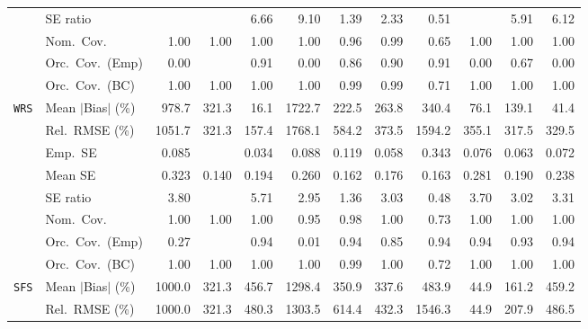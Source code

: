 \begin{landscape}
\begin{longtable}{llrrrrrrrrrr}
 & SE ratio &  &  & 6.66 & 9.10 & \cellcolor{rankone}1.39 & \cellcolor{rankthree}2.33 & \cellcolor{ranktwo}0.51 &  & 5.91 & 6.12 \\
 & Nom.\ Cov. & \cellcolor{rankthree}1.00 & 1.00 & 1.00 & 1.00 & \cellcolor{rankone}0.96 & \cellcolor{ranktwo}0.99 & 0.65 & 1.00 & 1.00 & 1.00 \\
 & Orc.\ Cov.\ (Emp) & 0.00 &  & \cellcolor{ranktwo}0.91 & 0.00 & 0.86 & \cellcolor{rankthree}0.90 & \cellcolor{rankone}0.91 & 0.00 & 0.67 & 0.00 \\
 & Orc.\ Cov.\ (BC) & \cellcolor{rankthree}1.00 & 1.00 & 1.00 & 1.00 & \cellcolor{rankone}0.99 & \cellcolor{ranktwo}0.99 & 0.71 & 1.00 & 1.00 & 1.00 \\
\addlinespace[2pt]
\quad \texttt{WRS} & Mean $|$Bias$|$ (\%) & 978.7 & 321.3 & \cellcolor{rankone}16.1 & 1722.7 & 222.5 & 263.8 & 340.4 & \cellcolor{rankthree}76.1 & 139.1 & \cellcolor{ranktwo}41.4 \\
 & Rel.\ RMSE (\%) & 1051.7 & \cellcolor{rankthree}321.3 & \cellcolor{rankone}157.4 & 1768.1 & 584.2 & 373.5 & 1594.2 & 355.1 & \cellcolor{ranktwo}317.5 & 329.5 \\
 & Emp.\ SE & 0.085 &  & 0.034 & 0.088 & 0.119 & 0.058 & 0.343 & 0.076 & 0.063 & 0.072 \\
 & Mean SE & 0.323 & 0.140 & 0.194 & 0.260 & 0.162 & 0.176 & 0.163 & 0.281 & 0.190 & 0.238 \\
 & SE ratio & 3.80 &  & 5.71 & \cellcolor{rankthree}2.95 & \cellcolor{rankone}1.36 & 3.03 & \cellcolor{ranktwo}0.48 & 3.70 & 3.02 & 3.31 \\
 & Nom.\ Cov. & \cellcolor{rankthree}1.00 & 1.00 & 1.00 & \cellcolor{rankone}0.95 & \cellcolor{ranktwo}0.98 & 1.00 & 0.73 & 1.00 & 1.00 & 1.00 \\
 & Orc.\ Cov.\ (Emp) & 0.27 &  & 0.94 & 0.01 & 0.94 & 0.85 & \cellcolor{rankone}0.94 & \cellcolor{ranktwo}0.94 & 0.93 & \cellcolor{rankthree}0.94 \\
 & Orc.\ Cov.\ (BC) & \cellcolor{ranktwo}1.00 & \cellcolor{rankthree}1.00 & 1.00 & 1.00 & \cellcolor{rankone}0.99 & 1.00 & 0.72 & 1.00 & 1.00 & 1.00 \\
\addlinespace[2pt]
\quad \texttt{SFS} & Mean $|$Bias$|$ (\%) & 1000.0 & \cellcolor{rankthree}321.3 & 456.7 & 1298.4 & 350.9 & 337.6 & 483.9 & \cellcolor{rankone}44.9 & \cellcolor{ranktwo}161.2 & 459.2 \\
 & Rel.\ RMSE (\%) & 1000.0 & \cellcolor{rankthree}321.3 & 480.3 & 1303.5 & 614.4 & 432.3 & 1546.3 & \cellcolor{rankone}44.9 & \cellcolor{ranktwo}207.9 & 486.5 \\

\end{longtable}
\end{landscape}

